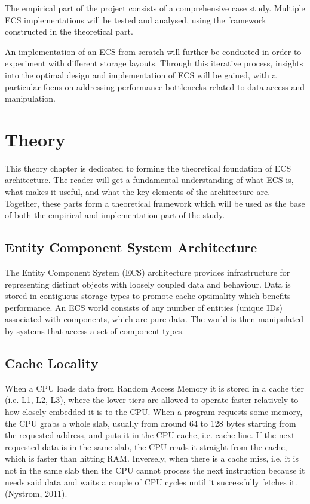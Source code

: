 \documentclass[openany, amssymb, psamsfonts]{amsart}
\theoremstyle{definition}
\numberwithin{equation}{section}
\begin{document}
The empirical part of the project consists of a comprehensive case study. Multiple ECS implementations will be tested and analysed, using the framework constructed in the theoretical part. 

An implementation of an ECS from scratch will further be conducted in order to experiment with different storage layouts. Through this iterative process, insights into the optimal design and implementation of ECS will be gained, with a particular focus on addressing performance bottlenecks related to data access and manipulation.

\section{Theory}
This theory chapter is dedicated to forming the theoretical foundation of ECS architecture. The reader will get a fundamental understanding of what ECS is, what makes it useful, and what the key elements of the architecture are. Together, these parts form a theoretical framework which will be used as the base of both the empirical and implementation part of the study.

\subsection{Entity Component System Architecture}
The Entity Component System (ECS) architecture provides infrastructure for representing distinct objects with loosely coupled data and behaviour. Data is stored in contiguous storage types to promote cache optimality which benefits performance. An ECS world consists of any number of entities (unique IDs) associated with components, which are pure data. The world is then manipulated by systems that access a set of component types. 
\subsection{Cache Locality}
When a CPU loads data from Random Access Memory it is stored in a cache tier (i.e. L1, L2, L3), 
where the lower tiers are allowed to operate faster relatively to how closely 
embedded it is to the CPU.\cite{Nystrom} When a program requests some memory, the CPU grabs a whole slab, usually from around 64 to 128 bytes starting from the requested address, and puts it in the CPU cache, i.e. cache line. If the next requested data is in the same slab, the CPU reads it straight from the cache, which is faster than hitting RAM. Inversely, when there is a cache miss, i.e. it is not in the same slab then the CPU cannot process the next instruction because it needs said data and waits a couple of CPU cycles until it successfully fetches it. (Nystrom, 2011). 
\end{document}
